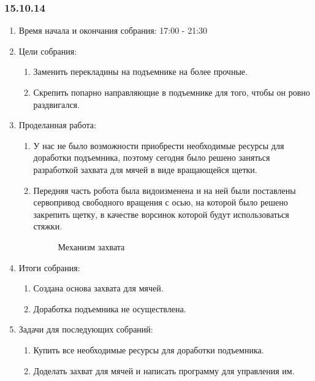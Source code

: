 
\subsubsection{15.10.14}

\begin{enumerate}
	\item Время начала и окончания собрания:
	17:00 - 21:30
	\item Цели собрания:
	\begin{enumerate}
	  \item Заменить перекладины на подъемнике на более прочные.
	  
	  \item Скрепить попарно направляющие в подъемнике для того, чтобы он ровно раздвигался.
	  
    \end{enumerate}
    
	\item Проделанная работа:
	\begin{enumerate}
	  \item У нас не было возможности приобрести необходимые ресурсы для доработки подъемника, поэтому сегодня было решено заняться разработкой захвата для мячей в виде вращающейся щетки.
      
      \item  Передняя часть робота была видоизменена и на ней были поставлены сервопривод свободного вращения с осью, на которой было решено закрепить щетку, в качестве ворсинок которой будут использоваться стяжки.
      
     \begin{figure}[H]
     	\begin{minipage}[h]{1\linewidth}
     		\caption{Механизм захвата}
     	\end{minipage}
     \end{figure}
      
    \end{enumerate}
    
	\item Итоги собрания: 
	\begin{enumerate}
	  \item Создана основа захвата для мячей.
	  
      \item Доработка подъемника не осуществлена.
      
    \end{enumerate}
    
	\item Задачи для последующих собраний:
	\begin{enumerate}
	  \item Купить все необходимые ресурсы для доработки подъемника.
	  
	  \item Доделать захват для мячей и написать программу для управления им.

    \end{enumerate}     
\end{enumerate}
\fillpage
